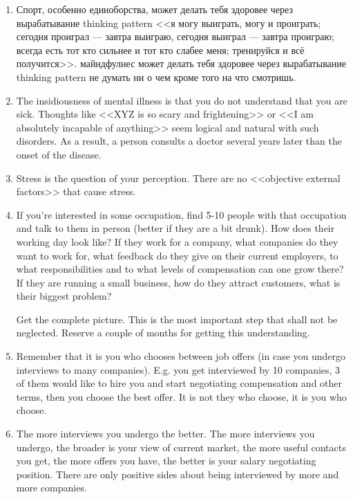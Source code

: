 \documentclass[11pt]{article}
\theoremstyle{remark}
\theoremstyle{definition}
\begin{document}
\begin{enumerate}
\item Спорт, особенно единоборства, может делать тебя здоровее через вырабатывание thinking pattern <<я могу выиграть, могу и проиграть; сегодня проиграл --- завтра выиграю, сегодня выиграл --- завтра проиграю; всегда есть тот кто сильнее и тот кто слабее меня; тренируйся и всё получится>>. майндфулнес может делать тебя здоровее через вырабатывание thinking pattern не думать ни о чем кроме того на что смотришь.



\item The insidiousness of mental illness is that you do not understand that you are sick. Thoughts like <<XYZ is so scary and frightening>> or <<I am absolutely incapable of anything>> seem logical and natural with such disorders. As a result, a person consults a doctor several years later than the onset of the disease.

\item Stress is the question of your perception. There are no <<objective external factors>> that cause stress.





\item If you're interested in some occupation, find 5-10 people with that occupation and talk to them in person (better if they are a bit drunk). How does their working day look like? If they work for a company, what companies do they want to work for, what feedback do they give on their current employers, to what responsibilities and to what levels of compensation can one grow there? If they are running a small business, how do they attract customers, what is their biggest problem?

Get the complete picture. This is the most important step that shall not be neglected. Reserve a couple of months for getting this understanding. 


\item Remember that it is you who chooses between job offers (in case you undergo interviews to many companies). E.g. you get interviewed by 10 companies, 3 of them would like to hire you and start negotiating compensation and other terms, then you choose the best offer. It is not they who choose, it is you who choose. 






\item The more interviews you undergo the better. The more interviews you undergo, the broader is your view of current market, the more useful contacts you get, the more offers you have, the better is your salary negotiating position. There are only positive sides about being interviewed by more and more companies.








\end{enumerate}
\end{document}
